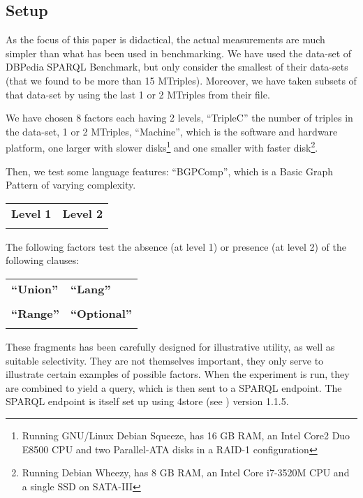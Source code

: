 \documentclass{llncs}
\begin{document}
\subsection{Setup}

As the focus of this paper is didactical, the actual measurements are
much simpler than what has been used in benchmarking. We have used the
data-set of DBPedia SPARQL Benchmark\cite{mxro:Morsey2011DBpedia}, but
only consider the smallest of their data-sets (that we found to be
more than 15 MTriples). Moreover, we have taken subsets of that
data-set by using the last 1 or 2 MTriples from their file.


We have chosen 8 factors each having 2 levels, ``TripleC'' the number
of triples in the data-set, 1 or 2 MTriples, ``Machine'', which is the
software and hardware platform, one larger with slower
disks\footnote{Running GNU/Linux Debian Squeeze, has 16 GB RAM, an
  Intel Core2 Duo E8500 CPU and two Parallel-ATA disks in a RAID-1
  configuration} and one smaller with faster disk\footnote{Running
  Debian Wheezy, has 8 GB RAM, an Intel Core i7-3520M CPU and a single
  SSD on SATA-III}.

Then, we test some language features: ``BGPComp'', which is a Basic
Graph Pattern of varying complexity. 

  \begin{center}\small
    \begin{tabular}{|@{~~}p{}|@{~~}p{}|}
      \hline
      \textbf{Level 1} & \textbf{Level 2} \\[-2ex] 
      
      & \\
      \hline
    \end{tabular}
  \end{center}

The following factors test the absence (at level 1) or presence (at
level 2) of the following clauses:

\begin{center}\small
  \begin{tabular}{|@{~~}p{}|@{~~}p{}|}
    \hline
    \textbf{``Union''} & \textbf{``Lang''} \\[-2ex]
     &
     \\
    \hline
    \textbf{``Range''} & \textbf{``Optional''} \\[-2ex]
     & 
    \\
    \hline
  \end{tabular}
\end{center}
These fragments has been carefully designed for illustrative utility,
as well as suitable selectivity. They are not themselves important,
they only serve to illustrate certain examples of possible
factors. When the experiment is run, they are combined to yield a
query, which is then sent to a SPARQL endpoint. The SPARQL endpoint is
itself set up using 4store (see \cite{harris20094store}) version
1.1.5. 
\end{document}
